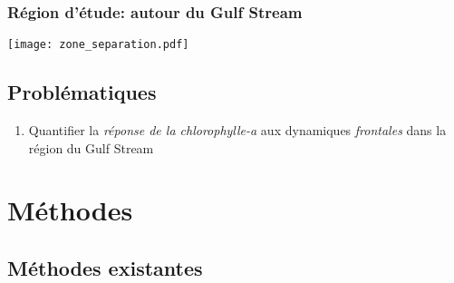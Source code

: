 \documentclass[11pt, french, aspectratio=32]{beamer}
\begin{document}
\begin{frame}
  \frametitle{Région d'étude: autour du Gulf Stream}


  \vfill

  \texttt{[image: zone\_separation.pdf]}
\end{frame}


\subsection{Problématiques}

\begin{frame}
  \vspace{2em}

  \begin{enumerate}
    \setlength{\itemsep}{1em}
    \item Quantifier la \emph{réponse de la chlorophylle-a} aux dynamiques \emph{frontales} dans la région du Gulf Stream
  \end{enumerate}
\end{frame}


\section*{Méthodes}

\begin{frame}
\end{frame}


\subsection{Méthodes existantes}
\end{document}
